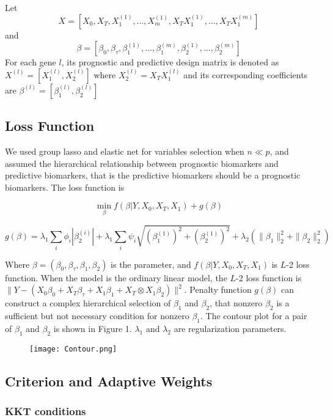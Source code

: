 \documentclass[12pt]{article}
\begin{document}
Let $$X=[X_0,X_T,X_1^{(1)},\dots,X_m^{(1)},X_TX_1^{(1)},\dots,X_TX_1^{(m)}]$$ and $$\beta=[\beta_0,\beta_\tau,\beta_1^{(1)},\dots,\beta_1^{(m)},\beta_2^{(1)},\dots,\beta_2^{(m)}]$$ For each gene $l$, its prognostic and predictive design matrix is denoted as $X^{(l)}=[X_1^{(l)},X_2^{(l)}]$ where $X_2^{(l)}=X_TX_1^{(l)}$ and its corresponding coefficients are $\beta^{(l)}=[\beta_1^{(l)},\beta_2^{(l)}]$

\subsection*{Loss Function}

We used group lasso and elastic net for variables selection when $n\ll p$, and assumed the hierarchical relationship between prognostic biomarkers and predictive biomarkers, that is the predictive biomarkers should be a prognostic biomarkers. The loss function is 

$$\min_{\beta} f(\beta|Y,X_0,X_T,X_1) + g(\beta)$$

$$g(\beta)=\lambda_1\sum_i\phi_i|\beta_2^{(i)}|+\lambda_1\sum_i\psi_i\sqrt{(\beta_1^{(1)})^2+(\beta_2^{(1)})^2}+\lambda_2(\parallel\beta_1\parallel_2^2+\parallel\beta_2\parallel_2^2)$$

Where $\beta=(\beta_0,\beta_\tau,\beta_1,\beta_2)$ is the parameter, and $f(\beta|Y,X_0,X_T,X_1) $ is $L$-2 loss function. When the model is the ordinary linear model, the $L$-2 loss function is $\parallel Y-(X_0\beta_0 + X_T\beta_\tau + X_1\beta_1+ X_T\otimes X_1 \beta_2) \parallel^2$. Penalty function $g(\beta)$ can construct a complex hierarchical selection of $\beta_1$ and $\beta_2$, that nonzero $\beta_2$ is a sufficient but not necessary condition for nonzero $\beta_1$. The contour plot for a pair of $\beta_1$ and $\beta_2$ is shown in Figure 1. $\lambda_1$ and $\lambda_2$ are regularization parameters.

\begin{figure}[t]
\texttt{[image: Contour.png]}
\centering
\end{figure}


\subsection*{Criterion and Adaptive Weights} 

\subsubsection*{KKT conditions}
\end{document}
